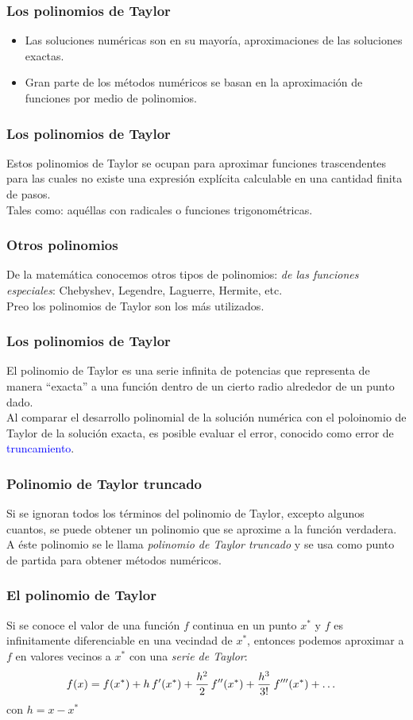 \documentclass[12pt]{beamer}
\begin{document}
\begin{frame}
\frametitle{Los polinomios de Taylor}
\begin{itemize}[<+->]
\item[\ding{212}] Las soluciones numéricas son en su mayoría, aproximaciones de las soluciones exactas.
\item[\ding{212}] Gran parte de los métodos numéricos se basan en la aproximación de funciones por medio de polinomios.
\end{itemize}
\end{frame}
\begin{frame}
\frametitle{Los polinomios de Taylor}
Estos polinomios de Taylor se ocupan para aproximar funciones trascendentes para las cuales no existe una expresión explícita calculable en una cantidad finita de pasos.
\\
\bigskip
\pause
Tales como: \pause aquéllas con radicales o funciones trigonométricas.
\end{frame}
\begin{frame}
\frametitle{Otros polinomios}
De la matemática conocemos otros tipos de polinomios: \pause \textit{de las funciones especiales}: Chebyshev, Legendre, Laguerre, Hermite, etc.
\\
\bigskip
\pause
Preo los polinomios de Taylor son los más utilizados.
\end{frame}
\begin{frame}
\frametitle{Los polinomios de Taylor}
El polinomio de Taylor es una serie infinita de potencias que representa de manera \enquote{exacta} a una función dentro de un cierto radio alrededor de un punto dado.
\\
\bigskip
\pause
Al comparar el desarrollo polinomial de la solución numérica con el poloinomio de Taylor de la solución exacta, \pause es posible evaluar el error, conocido como error de \textcolor{blue}{truncamiento}.
\end{frame}
\begin{frame}
\frametitle{Polinomio de Taylor truncado}
Si se ignoran todos los términos del polinomio de Taylor, excepto algunos cuantos, se puede obtener un polinomio que se aproxime a la función verdadera.
\\
\bigskip
\pause
A éste polinomio se le llama \textit{polinomio de Taylor truncado} y se usa como punto de partida para obtener métodos numéricos.
\end{frame}
\begin{frame}
\frametitle{El polinomio de Taylor}
Si se conoce el valor de una función $f$ continua en un punto $x^{*}$ y $f$ es infinitamente diferenciable en una vecindad de $x^{*}$, \pause entonces podemos aproximar a $f$ en valores vecinos a $x^{*}$ con una \emph{serie de Taylor}:
\pause
\begin{align*}
f (x) = f (x^{*}) + h \, {f}^{\prime} (x^{*}) &+ \dfrac{h^{2}}{2} \, {f}^{\prime \prime} (x^{*}) + \dfrac{h^{3}}{3!} \: {f}^{\prime \prime \prime} (x^{*}) + \ldots
\end{align*}
con $h = x - x^{*}$
\end{frame}
\end{document}
